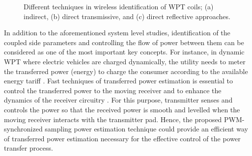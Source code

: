 \documentclass[journal,a4paper]{IEEEtran}
\begin{document}
\begin{figure}[t]
{%
    }%
    \caption{Different techniques in wireless identification of WPT coils; (a) indirect, (b) direct transmissive, and (c) direct reflective approaches.
    }
    \label{Fig1}
    \vspace{-6mm}
\end{figure}
In addition to the aforementioned system level studies, identification of the coupled side parameters and controlling the flow of power between them can be considered as one of the most important key concepts.
{\color{black} For instance, in dynamic WPT where electric vehicles are charged dynamically, the utility needs to meter the transferred power (energy) to charge the consumer according to the available energy tariff \cite{CHARGE1,CHARGE2}. Fast techniques of transferred power estimation is essential to control the transferred power to the moving receiver and to enhance the dynamics of the receiver circuitry \cite{ PC1, PC2}. For this purpose, transmitter senses and controls the power so that the received power is smooth and levelled when the moving receiver interacts with the transmitter pad. Hence, the proposed PWM-synchronized sampling power estimation technique could provide an efficient way of transferred power estimation necessary for the effective control of the power transfer process.}
\end{document}
